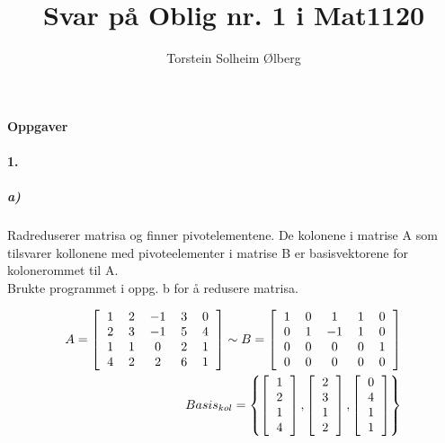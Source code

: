 \documentclass[11pt, A4paper,norsk]{article}
\author{Torstein Solheim Ølberg}
\title{Svar på Oblig nr. 1 i Mat1120}
\begin{document}
\maketitle
	\begin{center}
\Large \textbf{Oppgaver}
	\end{center}




		\paragraph{1.}
			\subparagraph{a)}
				\begin{flushleft}
Radreduserer matrisa og finner pivotelementene. De kolonene i matrise A som tilsvarer kollonene med pivoteelementer i matrise B er basisvektorene for kolonerommet til A. \\
Brukte programmet i oppg. b for å redusere matrisa.
				\end{flushleft}
				\begin{align}
A = \left[
\begin{tabular} { ccccc }
$1$ & $2$ & $-1$ & $3$ & $0$ \\
$2$ & $3$ & $-1$ & $5$ & $4$ \\
$1$ & $1$ & $0$ & $2$ & $1$ \\
$4$ & $2$ & $2$ & $6$ & $1$
\end{tabular}
\right] \sim B = \left[
\begin{tabular} { ccccc }
$1$ & $0$ & $1$ & $1$ & $0$ \\
$0$ & $1$ & $-1$ & $1$ & $0$ \\
$0$ & $0$ & $0$ & $0$ & $1$ \\
$0$ & $0$ & $0$ & $0$ & $0$
\end{tabular}
\right] \\
Basis_{kol} = 
\left\{
\left[
\begin{tabular} { c }
$1$ \\
$2$ \\
$1$ \\
$4$
\end{tabular}
\right]
,
\left[
\begin{tabular} { c }
$2$ \\
$3$ \\
$1$ \\
$2$
\end{tabular}
\right]
,
\left[
\begin{tabular} { c }
$0$ \\
$4$ \\
$1$ \\
$1$
\end{tabular}
\right]
\right\}
				\end{align}
\end{document}
